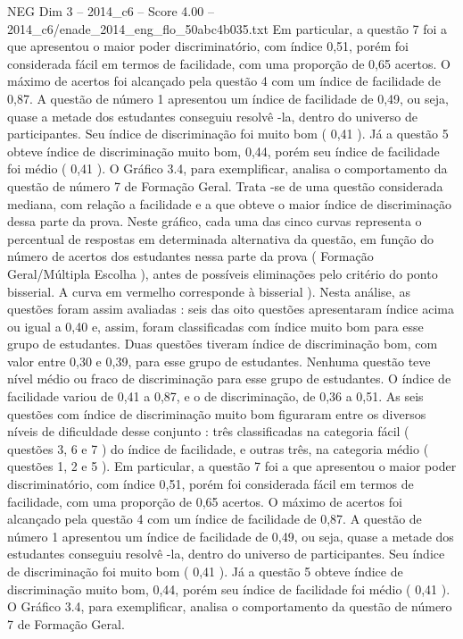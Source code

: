 \begin{textsample}{NEG Dim 3 – 2014\_c6 – Score 4.00 – 2014\_c6/enade\_2014\_eng\_flo\_50abc4b035.txt}
Em particular, a questão 7 foi a que apresentou o maior poder discriminatório, com índice 0,51, porém foi considerada fácil em termos de facilidade, com uma proporção de 0,65 acertos.
O máximo de acertos foi alcançado pela questão 4 com um índice de facilidade de 0,87.
A questão de número 1 apresentou um índice de facilidade de 0,49, ou seja, quase a metade dos estudantes conseguiu resolvê -la, dentro do universo de participantes.
Seu índice de discriminação foi muito bom ( 0,41 ).
Já a questão 5 obteve índice de discriminação muito bom, 0,44, porém seu índice de facilidade foi médio ( 0,41 ).
O Gráfico 3.4, para exemplificar, analisa o comportamento da questão de número 7 de Formação Geral.
Trata -se de uma questão considerada mediana, com relação a facilidade e a que obteve o maior índice de discriminação dessa parte da prova.
Neste gráfico, cada uma das cinco curvas representa o percentual de respostas em determinada alternativa da questão, em função do número de acertos dos estudantes nessa parte da prova ( Formação Geral/Múltipla Escolha ), antes de possíveis eliminações pelo critério do ponto bisserial.
A curva em vermelho corresponde à bisserial ).
Nesta análise, as questões foram assim avaliadas : seis das oito questões apresentaram índice acima ou igual a 0,40 e, assim, foram classificadas com índice muito bom para esse grupo de estudantes.
Duas questões tiveram índice de discriminação bom, com valor entre 0,30 e 0,39, para esse grupo de estudantes.
Nenhuma questão teve nível médio ou fraco de discriminação para esse grupo de estudantes.
O índice de facilidade variou de 0,41 a 0,87, e o de discriminação, de 0,36 a 0,51.
As seis questões com índice de discriminação muito bom figuraram entre os diversos níveis de dificuldade desse conjunto : três classificadas na categoria fácil ( questões 3, 6 e 7 ) do índice de facilidade, e outras três, na categoria médio ( questões 1, 2 e 5 ).
Em particular, a questão 7 foi a que apresentou o maior poder discriminatório, com índice 0,51, porém foi considerada fácil em termos de facilidade, com uma proporção de 0,65 acertos.
O máximo de acertos foi alcançado pela questão 4 com um índice de facilidade de 0,87.
A questão de número 1 apresentou um índice de facilidade de 0,49, ou seja, quase a metade dos estudantes conseguiu resolvê -la, dentro do universo de participantes.
Seu índice de discriminação foi muito bom ( 0,41 ).
Já a questão 5 obteve índice de discriminação muito bom, 0,44, porém seu índice de facilidade foi médio ( 0,41 ).
O Gráfico 3.4, para exemplificar, analisa o comportamento da questão de número 7 de Formação Geral.

\end{textsample}
